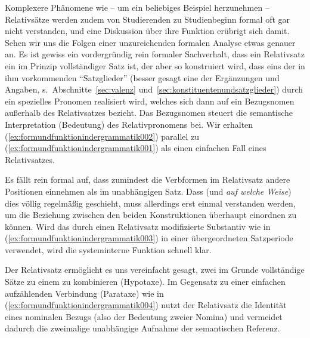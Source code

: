 Komplexere Phänomene wie -- um ein beliebiges Beispiel herzunehmen -- Relativsätze werden zudem von Studierenden zu Studienbeginn formal oft gar nicht verstanden, und eine Diskussion über ihre Funktion erübrigt sich damit.
Sehen wir uns die Folgen einer unzureichenden formalen Analyse etwas genauer an.
Es ist gewiss ein vordergründig rein formaler Sachverhalt, dass ein Relativsatz ein im Prinzip vollständiger Satz ist, der aber so konstruiert wird, dass eins der in ihm vorkommenden "`Satzglieder"' (besser gesagt eine der Ergänzungen und Angaben, s.\ Abschnitte~\ref{sec:valenz} und~\ref{sec:konstituentenundsatzglieder}) durch ein spezielles Pronomen realisiert wird, welches sich dann auf ein Bezugsnomen außerhalb des Relativsatzes bezieht.
Das Bezugsnomen steuert die semantische Interpretation (Bedeutung) des Relativpronomens bei.
Wir erhalten (\ref{ex:formundfunktionindergrammatik002}) parallel zu (\ref{ex:formundfunktionindergrammatik001}) als einen einfachen Fall eines Relativsatzes.

\begin{exe}
  \ex
  \begin{xlist}
  \end{xlist}
\end{exe}

Es fällt rein formal auf, dass zumindest die Verbformen im Relativsatz andere Positionen einnehmen als im unabhängigen Satz.
Dass (und \textit{auf welche Weise}) dies völlig regelmäßig geschieht, muss allerdings erst einmal verstanden werden, um die Beziehung zwischen den beiden Konstruktionen überhaupt einordnen zu können.
Wird das durch einen Relativsatz modifizierte Substantiv wie in (\ref{ex:formundfunktionindergrammatik003}) in einer übergeordneten Satzperiode verwendet, wird die systeminterne Funktion schnell klar.

\begin{exe}
\end{exe}



Der Relativsatz ermöglicht es uns vereinfacht gesagt, zwei im Grunde vollständige Sätze zu einem zu kombinieren (Hypotaxe).
Im Gegensatz zu einer einfachen aufzählenden Verbindung (Parataxe) wie in (\ref{ex:formundfunktionindergrammatik004}) nutzt der Relativsatz die Identität eines nominalen Bezugs (also der Bedeutung zweier Nomina) und vermeidet dadurch die zweimalige unabhängige Aufnahme der semantischen Referenz.

